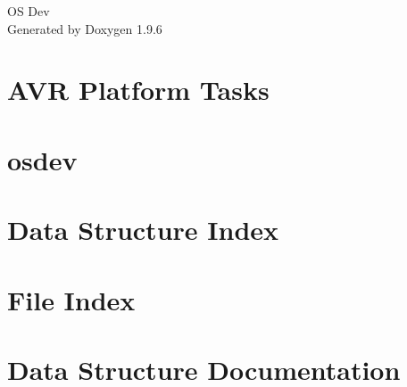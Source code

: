 \documentclass[twoside]{book}
\newcommand{\+}{\discretionary{\mbox{\scriptsize$\hookleftarrow$}}{}{}}
\newcommand{\clearemptydoublepage}{%
    \newpage{\pagestyle{empty}\cleardoublepage}%
  }
\begin{document}
  \raggedbottom
    \hypersetup{pageanchor=false,
                bookmarksnumbered=true,
                pdfencoding=unicode
               }
  \begin{titlepage}
  \vspace*{7cm}
  \begin{center}%
  {\Large OS Dev}\\
  \vspace*{1cm}
  {\large Generated by Doxygen 1.9.6}\\
  \end{center}
  \end{titlepage}
  \clearemptydoublepage
  \tableofcontents
  \clearemptydoublepage
  \hypersetup{pageanchor=true}
\chapter{AVR Platform Tasks}
\label{md_platform_avr_TODO}

\chapter{osdev}
\label{md_README}

\chapter{Data Structure Index}

\chapter{File Index}

\chapter{Data Structure Documentation}




















\end{document}
